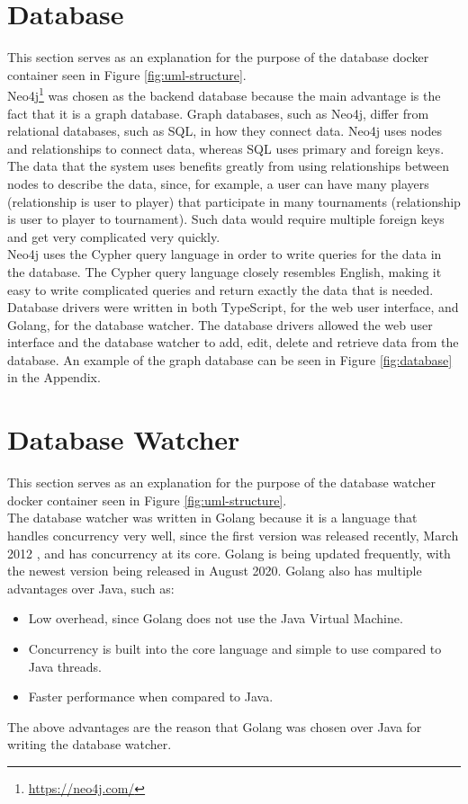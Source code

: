 \documentclass[a4paper, 12pt]{report}
\begin{document}
\section{Database}

This section serves as an explanation for the purpose of the database docker
container seen in Figure \ref{fig:uml-structure}. \\

Neo4j\footnote{\url{https://neo4j.com/}} was chosen as the backend database
because the main advantage is the fact that it is a graph database. Graph databases,
such as Neo4j, differ from relational databases, such as SQL, in how they connect
data. Neo4j uses nodes and relationships to connect data, whereas SQL uses
primary and foreign keys. The data that the system uses benefits greatly from
using relationships between nodes to describe the data, since, for example, a user
can have many players (relationship is user to player) that participate in many
tournaments (relationship is user to player to tournament). Such data would require
multiple foreign keys and get very complicated very quickly. \\

Neo4j uses the Cypher query language in order to write queries for the data in
the database. The Cypher query language closely resembles English, making it easy
to write complicated queries and return exactly the data that is needed. Database
drivers were written in both TypeScript, for the web user interface, and Golang,
for the database watcher. The database drivers allowed the web user interface
and the database watcher to add, edit, delete and retrieve data from the
database. An example of the graph database can be seen in Figure \ref{fig:database}
in the Appendix.

\section{Database Watcher}

This section serves as an explanation for the purpose of the database watcher
docker container seen in Figure \ref{fig:uml-structure}. \\

The database watcher was written in Golang because it is a language that handles
concurrency very well, since the first version was released recently, March 2012
\cite{golang}, and has concurrency at its core. Golang is being updated frequently,
with the newest version being released in August 2020. Golang also has multiple
advantages over Java, such as:
\begin{itemize}
	\item Low overhead, since Golang does not use the Java Virtual Machine.
	\item Concurrency is built into the core language and simple to use compared
	to Java threads.
	\item Faster performance when compared to Java.
\end{itemize}
The above advantages are the reason that Golang was chosen over Java for writing
the database watcher. \\
\end{document}
